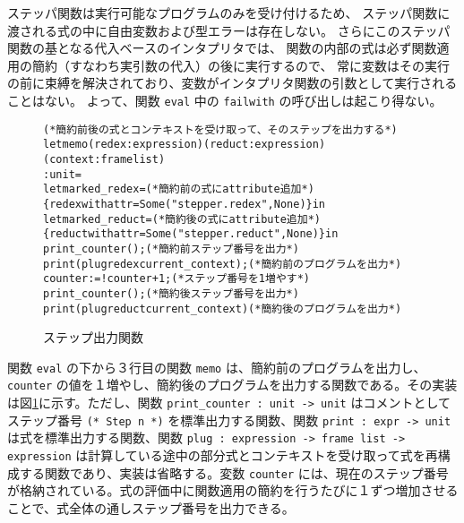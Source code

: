 ステッパ関数は実行可能なプログラムのみを受け付けるため、
ステッパ関数に渡される式の中に自由変数および型エラーは存在しない。
さらにこのステッパ関数の基となる代入ベースのインタプリタでは、
関数の内部の式は必ず関数適用の簡約（すなわち実引数の代入）の後に実行するので、
常に変数はその実行の前に束縛を解決されており、変数がインタプリタ関数の引数として実行されることはない。
よって、関数 \texttt{eval} 中の \texttt{failwith} の呼び出しは起こり得ない。

\begin{figure}[t]
\begin{spacing}{0.8}
\begin{alltt}
(* 簡約前後の式とコンテキストを受け取って、そのステップを出力する *)
let memo (redex : expression) (reduct : expression) (context : frame list)
  : unit =
  let marked\_redex =                            (* 簡約前の式に attribute 追加 *)
    \{redex with attr = Some ("stepper.redex", None)\} in
  let marked\_reduct =                           (* 簡約後の式に attribute 追加 *)
    \{reduct with attr = Some ("stepper.reduct", None)\} in
  print\_counter ();                                 (* 簡約前ステップ番号を出力 *)
  print (plug redex current\_context);               (* 簡約前のプログラムを出力 *)
  counter := !counter + 1;                          (* ステップ番号を 1 増やす *)
  print\_counter ();                                 (* 簡約後ステップ番号を出力 *)
  print (plug reduct current\_context)               (* 簡約後のプログラムを出力 *)
\end{alltt}
\end{spacing}
\caption{ステップ出力関数}
\label{figure:memo}
\end{figure}

関数 \texttt{eval} の下から３行目の関数 \texttt{memo} は、簡約前のプログラムを出力し、 \texttt{counter} の値を１増やし、簡約後のプログラムを出力する関数である。その実装は図\ref{figure:memo}に示す。ただし、関数 \texttt{print\_counter : unit -> unit} はコメントとしてステップ番号 \texttt{(* Step n *)} を標準出力する関数、関数 \texttt{print : expr -> unit} は式を標準出力する関数、関数 \texttt{plug : expression -> frame list -> expression} は計算している途中の部分式とコンテキストを受け取って式を再構成する関数であり、実装は省略する。変数 \texttt{counter} には、現在のステップ番号が格納されている。式の評価中に関数適用の簡約を行うたびに１ずつ増加させることで、式全体の通しステップ番号を出力できる。
